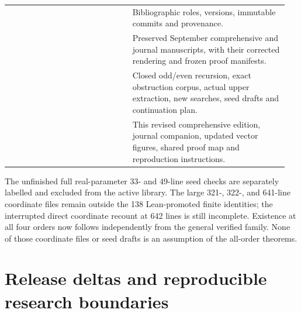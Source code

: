 \begin{longtable}{@{}P{0.42\linewidth}P{0.53\linewidth}@{}}
 & Bibliographic roles, versions, immutable commits and provenance.\\
 & Preserved September comprehensive and journal manuscripts, with their corrected rendering and frozen proof manifests.\\
 & Closed odd/even recursion, exact obstruction corpus, actual upper extraction, new searches, seed drafts and continuation plan.\\
 & This revised comprehensive edition, journal companion, updated vector figures, shared proof map and reproduction instructions.\\
\end{longtable}

The unfinished full real-parameter 33- and 49-line seed checks are separately labelled and excluded from the active library. The large 321-, 322-, and 641-line coordinate files remain outside the 138 Lean-promoted finite identities; the interrupted direct coordinate recount at 642 lines is still incomplete. Existence at all four orders now follows independently from the general verified family. None of those coordinate files or seed drafts is an assumption of the all-order theorems.


\section{Release deltas and reproducible research boundaries}\label{app:release-delta}

